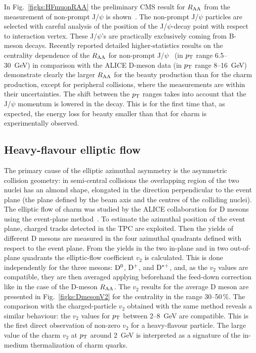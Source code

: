 In Fig.~\ref{figks:HFmuonRAA} the preliminary CMS result for $R_{\rm AA}$ from the measurement of non-prompt J/$\psi$ is shown~\cite{Chatrchyan:2012np}. The non-prompt J/$\psi$ particles are selected with careful analysis of the position of the J/$\psi$-decay point with respect to interaction vertex. These J/$\psi$'s are practically exclusively coming from B-meson decays. Recently reported detailed higher-statistics results on the centrality dependence of the $R_{\rm AA}$ for non-prompt J/$\psi$~\cite{CMS:2012wba} (in $p_{\rm T}$ range 6.5--30~GeV)  in comparison with the ALICE D-meson data (in $p_{\rm T}$ range 8--16~GeV) demonstrate clearly the larger $R_{\rm AA}$ for the beauty production than for the charm production, except for peripheral collisions, where the measurements are within their uncertainties. The shift between the $p_{\rm T}$ ranges takes into account that the J/$\psi$ momentum is lowered in the decay. This is for the first time that, as expected, the energy loss for beauty smaller than that for charm is experimentally observed.
\subsection{Heavy-flavour elliptic flow}
\label{subsecks:heavyflow}
The primary cause of the elliptic azimuthal asymmetry is the asymmetric collision geometry: in semi-central collisions the overlapping region of the two nuclei has an almond shape, elongated in the direction perpendicular to the event plane (the plane defined by the beam axis and the centres of the colliding nuclei). The elliptic flow of charm was studied by the ALICE collaboration for D mesons using the event-plane method~\cite{Abelev:2013lca}. To estimate the azimuthal position of the event plane, charged tracks detected in the TPC are exploited. Then the yields of different D mesons are measured in the four azimuthal quadrants defined with respect to the event plane. From the yields in the two in-plane and in two out-of-plane quadrants the elliptic-flow coefficient $v_2$ is calculated. This is done independently for the three mesons: ${\rm D}^0$, ${\rm D}^+$, and ${\rm D}^{*+}$, and, as the $v_2$ values are compatible, they are then averaged applying beforehand the feed-down correction like in the case of the D-meson $R_{\rm AA}$. The $v_2$ results for the average D meson are presented in Fig.~\ref{figks:DmesonV2} for the centrality in the range 30--50\,\%. The comparison with the charged-particle $v_2$ obtained with the same method reveals a similar behaviour: the $v_2$ values for $p_{\rm T}$ between 2--8~GeV are compatible. This is the first direct observation of non-zero $v_2$ for a heavy-flavour particle. The large value of the charm $v_2$ at $p_{\rm T}$ around 2~GeV is interpreted as a signature of the in-medium thermalization of charm quarks.

